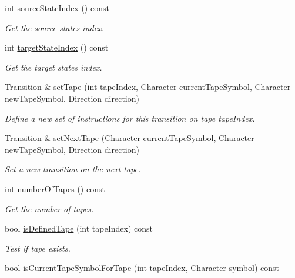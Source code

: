 \begin{DoxyCompactItemize}
int \hyperlink{classtum_1_1_transition_aae73e6b6e9720d75f557a3b847b2ccfe}{source\-State\-Index} () const 
\begin{DoxyCompactList}\small\item\em \-Get the source states index. \end{DoxyCompactList}\item 
int \hyperlink{classtum_1_1_transition_aed4183fe6e6ec81d162e200689fb1022}{target\-State\-Index} () const 
\begin{DoxyCompactList}\small\item\em \-Get the target states index. \end{DoxyCompactList}\item 
\hyperlink{classtum_1_1_transition}{\-Transition} \& \hyperlink{classtum_1_1_transition_a7c0c01baa608cbb53216eeb0376e5884}{set\-Tape} (int tape\-Index, \-Character current\-Tape\-Symbol, \-Character new\-Tape\-Symbol, \-Direction direction)
\begin{DoxyCompactList}\small\item\em \-Define a new set of instructions for this transition on tape {\ttfamily tape\-Index}. \end{DoxyCompactList}\item 
\hyperlink{classtum_1_1_transition}{\-Transition} \& \hyperlink{classtum_1_1_transition_a0154555df92f4064a6cddb6d95e30734}{set\-Next\-Tape} (\-Character current\-Tape\-Symbol, \-Character new\-Tape\-Symbol, \-Direction direction)
\begin{DoxyCompactList}\small\item\em \-Set a new transition on the next tape. \end{DoxyCompactList}\item 
int \hyperlink{classtum_1_1_transition_a1a441e5bd91e94c49656ec81ef41ecc5}{number\-Of\-Tapes} () const 
\begin{DoxyCompactList}\small\item\em \-Get the number of tapes. \end{DoxyCompactList}\item 
bool \hyperlink{classtum_1_1_transition_a4a5f32d06751b1d98823668c699e7267}{is\-Defined\-Tape} (int tape\-Index) const 
\begin{DoxyCompactList}\small\item\em \-Test if tape exists. \end{DoxyCompactList}\item 
bool \hyperlink{classtum_1_1_transition_afd75b7a89193f35a52e80c2588b7d491}{is\-Current\-Tape\-Symbol\-For\-Tape} (int tape\-Index, \-Character symbol) const 

\end{DoxyCompactItemize}
